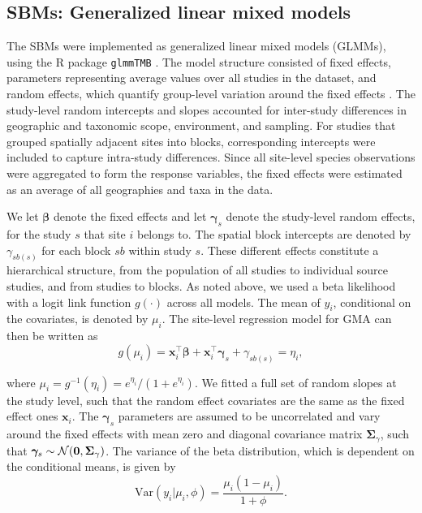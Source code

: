 
\subsection*{SBMs: Generalized linear mixed models}

The SBMs were implemented as generalized linear mixed models (GLMMs), using the R package \texttt{glmmTMB} \cite{mcgillycuddy2025}. The model structure consisted of fixed effects, parameters representing average values over all studies in the dataset, and random effects, which quantify group-level variation around the fixed effects \cite{harrison2018,pinheiro2000}. The study-level random intercepts and slopes accounted for inter-study differences in geographic and taxonomic scope, environment, and sampling. For studies that grouped spatially adjacent sites into blocks, corresponding intercepts were included to capture intra-study differences. Since all site-level species observations were aggregated to form the response variables, the fixed effects were estimated as an average of all geographies and taxa in the data\cite{newbold2015,newbold2016,depalma2021}.

We let $\boldsymbol{\beta}$ denote the fixed effects and let  $\boldsymbol{\gamma}_s$ denote the study-level random effects, for the study $s$ that site $i$ belongs to. The spatial block intercepts are denoted by $\gamma_{sb(s)}$ for each block $sb$ within study $s$. These different effects constitute a hierarchical structure, from the population of all studies to individual source studies, and from studies to blocks. As noted above, we used a beta likelihood with a logit link function $g(\cdot)$ across all models\cite{ferrari2004}. The mean of $y_i$, conditional on the covariates, is denoted by $\mu_i$. The site-level regression model for GMA can then be written as
\vspace{0.25\baselineskip}
\begin{equation*}
    g(\mu_{i}) = \mathbf{x}_i^\top \boldsymbol{\beta} + \mathbf{x}_i^\top \boldsymbol{\gamma}_s + \gamma_{sb(s)} = \eta_i,
\end{equation*}

where $\mu_i = g^{-1}(\eta_i) = e^{\eta_{i}} / (1 + e^{\eta_{i}})$. We fitted a full set of random slopes at the study level, such that the random effect covariates are the same as the fixed effect ones $\mathbf{x}_i$. The $\boldsymbol{\gamma}_s$ parameters are assumed to be uncorrelated and vary around the fixed effects with mean zero and diagonal covariance matrix $\boldsymbol{\Sigma}_{\gamma}$, such that $\boldsymbol{\gamma}_s \sim \mathcal{N}(\bf{0}, \boldsymbol{\Sigma}_{\gamma})$. The variance of the beta distribution, which is dependent on the conditional means, is given by
\begin{equation*}
    \text{Var}(y_i | \mu_i, \phi) = \frac{\mu_i(1 - \mu_i)}{1 + \phi}.
\end{equation*}

